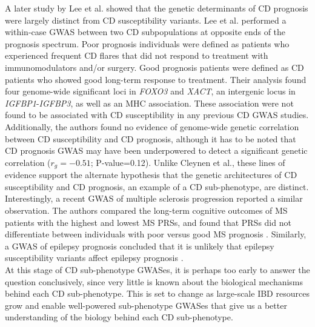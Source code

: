 A later study by Lee et al. \cite{Lee2017-tl} showed that the genetic determinants of CD prognosis were largely distinct from CD susceptibility variants. Lee et al. performed a within-case GWAS between two CD subpopulations at opposite ends of the prognosis spectrum. Poor prognosis individuals were defined as patients who experienced frequent CD flares that did not respond to treatment with immunomodulators and/or surgery. Good prognosis patients were defined as CD patients who showed good long-term response to treatment. Their analysis found four genome-wide significant loci in \textit{FOXO3} and \textit{XACT}, an intergenic locus in \textit{IGFBP1}-\textit{IGFBP3}, as well as an MHC association. These association were not found to be associated with CD susceptibility in any previous CD GWAS studies. Additionally, the authors found no evidence of genome-wide genetic correlation between CD susceptibility and CD prognosis, although it has to be noted that CD prognosis GWAS may have been underpowered to detect a significant genetic correlation ($r_{g}=-0.51$; P-value=0.12). Unlike Cleynen et al., these lines of evidence support the alternate hypothesis that the genetic architectures of CD susceptibility and CD prognosis, an example of a CD sub-phenotype, are distinct. Interestingly, a recent GWAS of multiple sclerosis progression reported a similar observation. The authors compared the long-term cognitive outcomes of MS patients with the highest and lowest MS PRSs, and found that PRSs did not differentiate between individuals with poor versus good MS prognosis \cite{ms_susceptibility}. Similarly, a GWAS of epilepsy prognosis concluded that it is unlikely that epilepsy susceptibility variants affect epilepsy prognosis \cite{Speed2014-lz}.\\

At this stage of CD sub-phenotype GWASes, it is perhaps too early to answer the question conclusively, since very little is known about the biological mechanisms behind each CD sub-phenotype. This is set to change as large-scale IBD resources grow and enable well-powered sub-phenotype GWASes that give us a better understanding of the biology behind each CD sub-phenotype. \\


